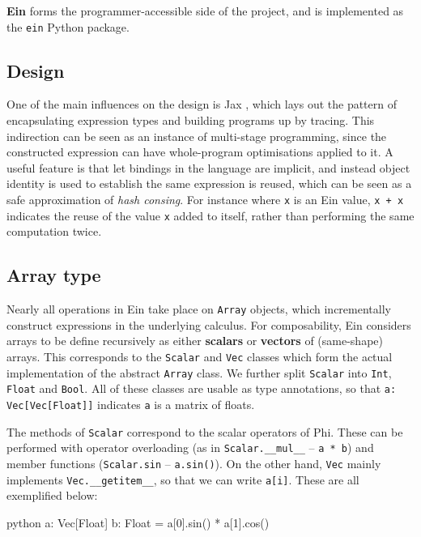 \textbf{Ein} forms the programmer-accessible side of the project, and is implemented as the \texttt{ein} Python package.

\subsection{Design}

One of the main influences on the design is Jax \cite{frostig2018compiling}, which lays out the pattern of encapsulating expression types and building programs up by tracing. This indirection can be seen as an instance of multi-stage programming, since the constructed expression can have whole-program optimisations applied to it. A useful feature is that let bindings in the language are implicit, and instead object identity is used to establish the same expression is reused, which can be seen as a safe approximation of \textit{hash consing}. For instance where \texttt{x} is an Ein value, \texttt{x + x} indicates the reuse of the value \texttt{x} added to itself, rather than performing the same computation twice.

\subsection{Array type}

Nearly all operations in Ein take place on \texttt{Array} objects, which incrementally construct expressions in the underlying calculus. For composability, Ein considers arrays to be define recursively as either \textbf{scalars} or \textbf{vectors} of (same-shape) arrays. This corresponds to the \texttt{Scalar} and \texttt{Vec} classes which form the actual implementation of the abstract \texttt{Array} class. We further split \texttt{Scalar} into \texttt{Int}, \texttt{Float} and \texttt{Bool}. All of these classes are usable as type annotations, so that \texttt{a: Vec[Vec[Float]]} indicates \texttt{a} is a matrix of floats.

The methods of \texttt{Scalar} correspond to the scalar operators of Phi. These can be performed with operator overloading (as in \texttt{Scalar.\_\_mul\_\_} -- \texttt{a * b}) and member functions (\texttt{Scalar.sin} -- \texttt{a.sin()}). On the other hand, \texttt{Vec} mainly implements \texttt{Vec.\_\_getitem\_\_}, so that we can write \texttt{a[i]}. These are all exemplified below:
\begin{center}
\begin{cminted}{python}
a: Vec[Float]
b: Float = a[0].sin() * a[1].cos()
\end{cminted}
\end{center}

